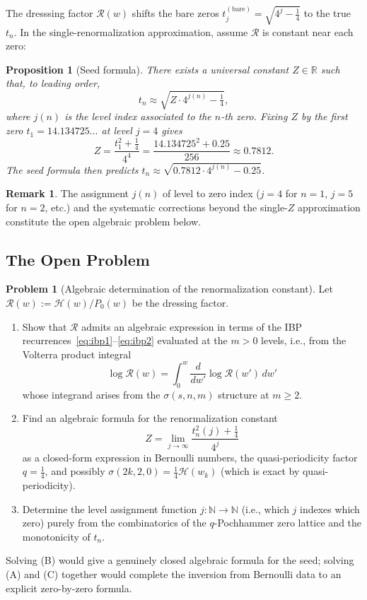 \documentclass[%
 aip,
 amsmath,amssymb,
 reprint,%
]{revtex4-1}
\theoremstyle{plain}
\newtheorem{proposition}[theorem]{Proposition}
\theoremstyle{definition}
\newtheorem{remark}[theorem]{Remark}
\newtheorem{problem}[theorem]{Problem}
\newcommand{\R}{\mathbb{R}}
\newcommand{\N}{\mathbb{N}}
\begin{document}
The dresssing factor $\mathcal{R}(w)$ shifts the bare zeros $t_j^{(\mathrm{bare})}
= \sqrt{4^j-\tfrac{1}{4}}$ to the true $t_n$.  In the single-renormalization
approximation, assume $\mathcal{R}$ is constant near each zero:

\begin{proposition}[Seed formula]\label{prop:seed}
There exists a universal constant $Z\in\R$ such that, to leading order,
\[
t_n \approx \sqrt{Z\cdot 4^{j(n)} - \tfrac{1}{4}},
\]
where $j(n)$ is the level index associated to the $n$-th zero.
Fixing $Z$ by the first zero $t_1 = 14.134725\ldots$ at level $j=4$ gives
\[
Z = \frac{t_1^2+\tfrac{1}{4}}{4^4}
= \frac{14.134725^2 + 0.25}{256}
\approx 0.7812.
\]
The seed formula then predicts $t_n\approx\sqrt{0.7812\cdot 4^{j(n)}-0.25}$.
\end{proposition}

\begin{remark}
The assignment $j(n)$ of level to zero index ($j=4$ for $n=1$, $j=5$ for
$n=2$, etc.) and the systematic corrections beyond the single-$Z$ approximation
constitute the open algebraic problem below.
\end{remark}

\subsection{The Open Problem}

\begin{problem}[Algebraic determination of the renormalization constant]\label{prob:seed}
Let $\mathcal{R}(w) := \mathcal{H}(w)/P_0(w)$ be the dressing factor.

\begin{enumerate}
\item[(\textbf{A})] Show that $\mathcal{R}$ admits an algebraic expression
in terms of the IBP recurrences~\eqref{eq:ibp1}--\eqref{eq:ibp2} evaluated at
the $m>0$ levels, i.e., from the Volterra product integral
  \[
  \log\mathcal{R}(w) = \int_0^w \frac{d}{dw'}\log\mathcal{R}(w')\,dw'
  \]
  whose integrand arises from the $\sigma(s, n, m)$ structure at $m\ge 2$.

\item[(\textbf{B})] Find an algebraic formula for the renormalization constant
\[
Z = \lim_{j\to\infty} \frac{t_n^2(j)+\tfrac{1}{4}}{4^j}
\]
as a closed-form expression in Bernoulli numbers, the quasi-periodicity factor
$q=\tfrac{1}{4}$, and possibly $\sigma(2k,2,0) = \tfrac{1}{4}\mathcal{H}(w_k)$
(which is exact by quasi-periodicity).

\item[(\textbf{C})] Determine the level assignment function $j:\N\to\N$ (i.e.,
which $j$ indexes which zero) purely from the combinatorics of the
$q$-Pochhammer zero lattice and the monotonicity of $t_n$.
\end{enumerate}

Solving \textup{(B)} would give a genuinely closed algebraic formula for the
seed; solving \textup{(A)} and \textup{(C)} together would complete the
inversion from Bernoulli data to an explicit zero-by-zero formula.
\end{problem}
\end{document}
